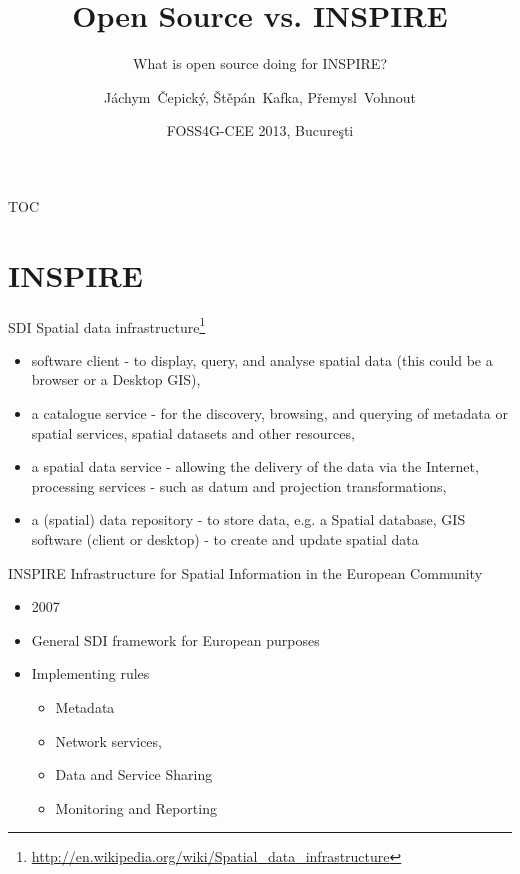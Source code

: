 \documentclass[xcolor=dvipsnames]{beamer}
\title[Open Source] %
{Open Source vs. INSPIRE}
\subtitle {What is open source doing for INSPIRE?}
\author[J. Čepický] %
{Jáchym~Čepický\inst{1}, Štěpán~Kafka\inst{1}, Přemysl~Vohnout\inst{2}}
\institute %
{
  \inst{1}%
  Help Service - Remote Sensing s.r.o. \\
  Benešov\\
  \url{http://hsrs.cz}\\

  \inst{2}%
  Czech Center for Science and Society\\
  Prague\\
  \url{http://ccss.cz}\\
}
\date[] %
{FOSS4G-CEE 2013, Bucure\c{s}ti}
\begin{document}
\begin{frame}
  \titlepage
\end{frame}

\begin{frame}{TOC}
  \tableofcontents
\end{frame}

\section{INSPIRE}

\begin{frame}{SDI}
Spatial data infrastructure\footnote{\url{http://en.wikipedia.org/wiki/Spatial_data_infrastructure}}
\begin{itemize} 
    \item software client - to display, query, and analyse spatial data (this could be a browser or a Desktop GIS),
    \item a catalogue service - for the discovery, browsing, and querying of metadata or spatial services, spatial datasets and other resources,
    \item a spatial data service - allowing the delivery of the data via the Internet, processing services - such as datum and projection transformations,
    \item a (spatial) data repository - to store data, e.g. a Spatial database, GIS software (client or desktop) - to create and update spatial data
\end{itemize}
\end{frame}

\begin{frame}{INSPIRE}
Infrastructure for Spatial Information in the European Community
\begin{itemize} 
    \item 2007
    \item General SDI framework for European purposes
    \item Implementing rules 
        \begin{itemize}
            \item Metadata
            \item Network services,
            \item Data and Service Sharing
            \item Monitoring and Reporting
        \end{itemize}
\end{itemize}
\end{frame}
\end{document}
